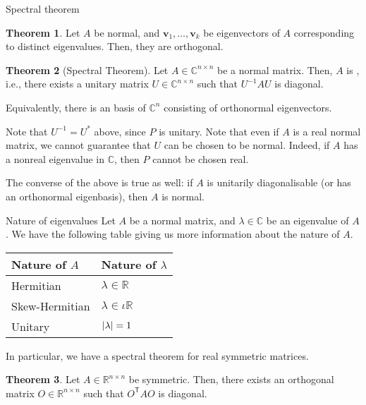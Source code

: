 \documentclass[dvipsnames]{beamer}
\theoremstyle{definition}
\newtheorem{thm}{Theorem}
\begin{document}
\begin{frame}{Spectral theorem}
    \begin{thm}
        Let $A$ be normal, and $\mathbf{v}_{1}, \ldots, \mathbf{v}_{k}$ be eigenvectors of $A$ corresponding to distinct eigenvalues. \pause Then, they are orthogonal.
    \end{thm} \pause

    \begin{thm}[Spectral Theorem]
        Let $A \in \mathbb{C}^{n \times n}$ be a normal matrix. Then, $A$ is , \pause i.e., there exists a unitary matrix $U \in \mathbb{C}^{n \times n}$ such that $U^{-1} A U$ is diagonal. \pause

        Equivalently, there is an basis of $\mathbb{C}^{n}$ consisting of orthonormal eigenvectors.
    \end{thm} \pause

    Note that $U^{-1} = U^{\ast}$ above, since $P$ is unitary. \pause Note that even if $A$ is a real normal matrix, we cannot guarantee that $U$ can be chosen to be normal. \pause Indeed, if $A$ has a nonreal eigenvalue in $\mathbb{C}$, then $P$ cannot be chosen real. \pause

    The converse of the above is true as well: if $A$ is unitarily diagonalisable (or has an orthonormal eigenbasis), then $A$ is normal.
\end{frame}
\begin{frame}{Nature of eigenvalues}
    Let $A$ be a normal matrix, and $\lambda \in \mathbb{C}$ be an eigenvalue of $A$. \pause We have the following table giving us more information about the nature of $A$.

    \begin{center}
        \begin{tabular}{|l|l|}
            \hline
            Nature of $A$ & Nature of $\lambda$ \\
            \hline
            Hermitian & $\lambda \in \mathbb{R}$ \\ 
            Skew-Hermitian & $\lambda \in \iota \mathbb{R}$ \\
            Unitary & ${\left\lvert \lambda \right\lvert} = 1$ \\
            \hline
        \end{tabular}
    \end{center} \pause

    In particular, we have a spectral theorem for real symmetric matrices. \pause

    \begin{thm}
        Let $A \in \mathbb{R}^{n \times n}$ be symmetric. Then, there exists an orthogonal matrix $O \in \mathbb{R}^{n \times n}$ such that $O^{\mathsf{T}} A O$ is diagonal.
    \end{thm}
\end{frame}
\end{document}

